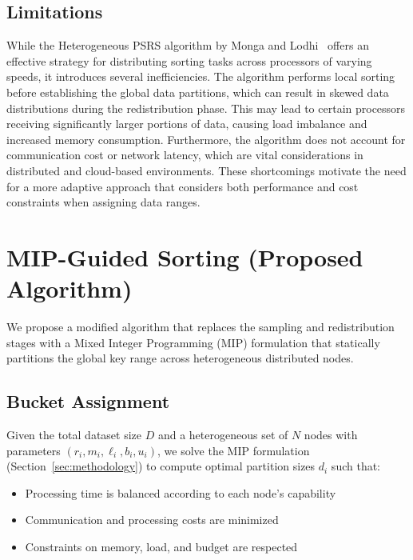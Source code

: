 \documentclass[]{interact}
\theoremstyle{plain}
\theoremstyle{definition}
\theoremstyle{remark}
\begin{document}
\subsection{Limitations}

While the Heterogeneous PSRS algorithm by Monga and Lodhi~\cite{monga2020heterogeneous} offers an effective strategy for distributing sorting tasks across processors of varying speeds, it introduces several inefficiencies. The algorithm performs local sorting before establishing the global data partitions, which can result in skewed data distributions during the redistribution phase. This may lead to certain processors receiving significantly larger portions of data, causing load imbalance and increased memory consumption. Furthermore, the algorithm does not account for communication cost or network latency, which are vital considerations in distributed and cloud-based environments. These shortcomings motivate the need for a more adaptive approach that considers both performance and cost constraints when assigning data ranges.






\section{MIP-Guided Sorting (Proposed Algorithm)}

We propose a modified algorithm that replaces the sampling and redistribution stages with a Mixed Integer Programming (MIP) formulation that statically partitions the global key range across heterogeneous distributed nodes.

\subsection{Bucket Assignment}

Given the total dataset size $D$ and a heterogeneous set of $N$ nodes with parameters $(r_i, m_i, \ell_i, b_i, u_i)$, we solve the MIP formulation (Section~\ref{sec:methodology}) to compute optimal partition sizes $d_i$ such that:

\begin{itemize}
    \item Processing time is balanced according to each node's capability
    \item Communication and processing costs are minimized
    \item Constraints on memory, load, and budget are respected
\end{itemize}
\end{document}
